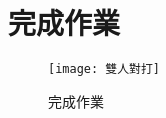 \chapter{完成作業}
\begin{figure}[hbt!]
\begin{center}
\texttt{[image: 雙人對打]}
\caption{\Large 完成作業}
\label{完成作業}
\end{center}
\end{figure}
